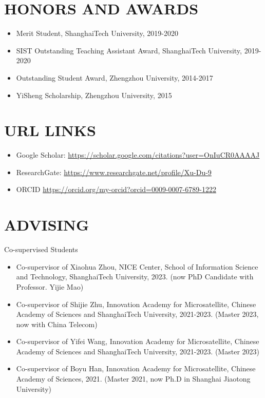 \documentclass[paper=a4,fontsize=11pt]{scrartcl} %
\newcommand{\sepspace}{\vspace*{1em}}		%
\newcommand{\NewPart}[1]{\section*{\uppercase{#1}}}
\newcommand{\EducationEntry}[4]{
	\noindent \textbf{#1} \hfill      %
	\colorbox{White}{%
		\parbox{5cm}{%
			\hfill\color{Black}#2}} \par  %
	\noindent \textit{#3} \par        %
	\noindent\hangindent=2em\hangafter=0 \small #4 %
	\normalsize \par}
\begin{document}
			
			\NewPart{HONORS AND AWARDS}
			\begin{itemize}
				\item Merit Student, ShanghaiTech University, 2019-2020
				
				\item SIST Outstanding Teaching Assistant Award, ShanghaiTech University, 2019-2020
				
				
				\item Outstanding Student Award, Zhengzhou University, 2014-2017
				
				\item YiSheng Scholarship, Zhengzhou University, 2015
				
				
			\end{itemize}
			\NewPart{URL Links}
			\begin{itemize}
				\item Google Scholar: \url{https://scholar.google.com/citations?user=OnIuCR0AAAAJ}
				\item ResearchGate: \url{https://www.researchgate.net/profile/Xu-Du-9}
				\item ORCID \url{https://orcid.org/my-orcid?orcid=0009-0007-6789-1222}
			\end{itemize}
			\NewPart{Advising}{Co-supervised Students}
			\begin{itemize}
				
				\item Co-supervisor of Xiaohua Zhou, NICE Center, School of Information Science and Technology,  ShanghaiTech University, 2023.
				(now PhD Candidate with Professor. Yijie Mao)
				
				
					\item Co-supervisor of Shijie Zhu, Innovation Academy for Microsatellite, Chinese Academy of Sciences  and ShanghaiTech University, 2021-2023.
				(Master 2023, now with China Telecom)
				
				
					\item Co-supervisor of Yifei Wang, Innovation Academy for Microsatellite, Chinese Academy of Sciences and ShanghaiTech University, 2021-2023.
				(Master 2023)
				
				\item Co-supervisor of Boyu Han, Innovation Academy for Microsatellite, Chinese Academy of Sciences, 2021.
				(Master 2021, now Ph.D in Shanghai Jiaotong University)
			
			
			\end{itemize}
			
\end{document}
